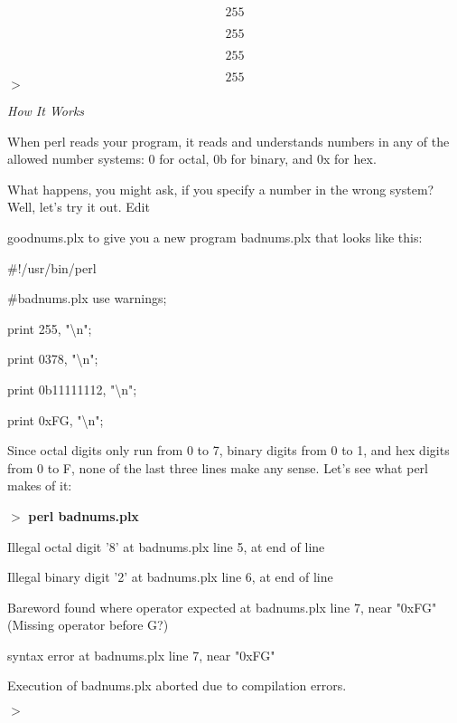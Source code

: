 \documentclass[a4paper,11pt]{book}
\begin{document}
\[255\] 

\[255\] 

\[255\] 

\[255\] 
$>$

\noindent 

\noindent \textit{How It Works}

\noindent When perl reads your program, it reads and understands numbers in any of the allowed number systems: 0 for octal, 0b for binary, and 0x for hex.

\noindent 

\noindent What happens, you might ask, if you specify a number in the wrong system? Well, let's try it out. Edit

\noindent goodnums.plx to give you a new program badnums.plx that looks like this:

\noindent 

\noindent 

\noindent \#!/usr/bin/perl

\noindent \#badnums.plx use warnings;

\noindent print 255, "\textbackslash n";

\noindent print 0378, "\textbackslash n";

\noindent print 0b11111112, "\textbackslash n";

\noindent print 0xFG, "\textbackslash n";

\noindent 

\noindent Since octal digits only run from 0 to 7, binary digits from 0 to 1, and hex digits from 0 to F, none of the last three lines make any sense. Let's see what perl makes of it:

\noindent 

\noindent $>$ \textbf{perl badnums.plx}

\noindent Illegal octal digit '8' at badnums.plx line 5, at end of line

\noindent Illegal binary digit '2' at badnums.plx line 6, at end of line

\noindent Bareword found where operator expected at badnums.plx line 7, near "0xFG" (Missing operator before G?)

\noindent syntax error at badnums.plx line 7, near "0xFG"

\noindent Execution of badnums.plx aborted due to compilation errors.

\noindent $>$

\noindent 

\noindent 
\end{document}
